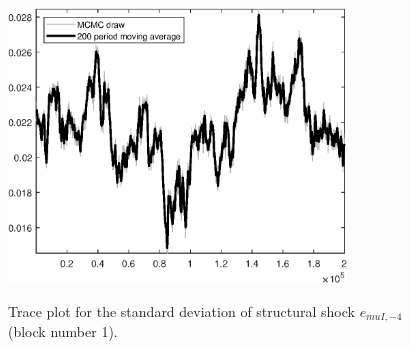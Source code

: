 \begin{figure}[H]
\centering
  \includegraphics[width=0.8\textwidth]{BRS_sectoral_rest/graphs/TracePlot_SE_e_muI_news_blck_1}\\
    \caption{Trace plot for the standard deviation of structural shock ${e_{muI,-4}}$ (block number 1).}
\end{figure}
